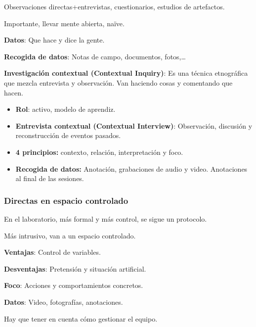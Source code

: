 \documentclass[12pt, twoside, openright]{report} %
\begin{document}
\hspace{6mm} Observaciones directas+entrevistas, cuestionarios, estudios
de artefactos.

\hspace{6mm} Importante, llevar mente abierta, naïve.

\hspace{6mm} \textbf{Datos}: Que hace y dice la gente.

\hspace{6mm} \textbf{Recogida de datos}: Notas de campo, documentos,
fotos,\ldots{}

\textbf{Investigación contextual (Contextual Inquiry)}: Es una técnica etnográfica que mezcla entrevista y observación. Van haciendo cosas y comentando que hacen.
\begin{itemize}
	\item \textbf{Rol}: activo, modelo de aprendiz.
	\item \textbf{Entrevista contextual (Contextual Interview)}: Observación, discusión y
	      reconstrucción de eventos pasados.
	\item \textbf{4 principios:} contexto, relación, interpretación y
	      foco.
	\item \textbf{Recogida de datos:} Anotación, grabaciones de audio y
	      video. Anotaciones al final de las sesiones.
\end{itemize}
\pagebreak

\subsubsection{Directas en espacio controlado}

En el laboratorio, más formal y más control, se sigue un protocolo.

Más intrusivo, van a un espacio controlado.

\textbf{Ventajas}: Control de variables.

\textbf{Desventajas}: Pretensión y situación artificial.

\textbf{Foco}: Acciones y comportamientos concretos.

\textbf{Datos}: Video, fotografías, anotaciones.

Hay que tener en cuenta cómo gestionar el equipo.
\end{document}
